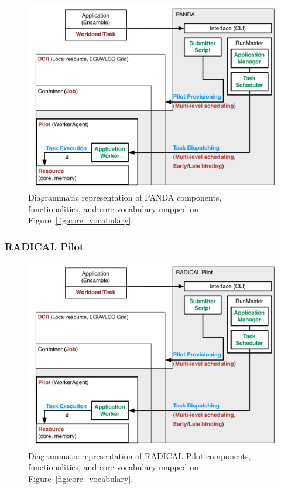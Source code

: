 \documentclass{sig-alternate}
\begin{document}
\begin{figure}[t]
    \centering
        \includegraphics[width=.48\textwidth]{figures/panda_comparison.pdf}
    \caption{Diagrammatic representation of PANDA components,
    functionalities, and core vocabulary mapped on
    Figure~\ref{fig:core_vocabulary}.}
    \label{fig:diane_comparison}
\end{figure}








%
\subsubsection{RADICAL Pilot}
\label{sec:radical_pilot}




\begin{figure}[t]
    \centering
        \includegraphics[width=.48\textwidth]{figures/radicalp_comparison.pdf}
    \caption{Diagrammatic representation of RADICAL Pilot components,
    functionalities, and core vocabulary mapped on
    Figure~\ref{fig:core_vocabulary}.}
    \label{fig:diane_comparison}
\end{figure}
\end{document}
